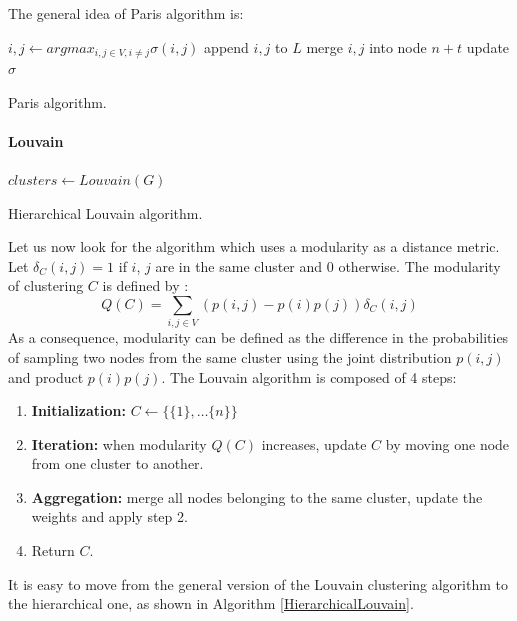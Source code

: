 The general idea of Paris algorithm is:

\begin{algorithm}[h]
    \SetAlgoLined
     {
        $i,j \leftarrow argmax_{i,j \in V, i \ne j}\sigma(i,j)$ \;
        append $i,j$ to $L$
        merge $i,j$ into node $n+t$
        update $\sigma$
    }
    \EndFor
    \caption{Paris algorithm.}
    \label{paris}
\end{algorithm}

\paragraph{Louvain}

\begin{algorithm}[h]
	\SetAlgoLined
	
	$clusters \leftarrow Louvain(G)$\;
	\caption{Hierarchical Louvain algorithm.}
	\label{HierarchicalLouvain}
\end{algorithm}

Let us now look for the algorithm which uses a modularity as a distance metric. Let $\delta_{C}(i, j) = 1$ if $i$, $j$ are in the same cluster and 0 otherwise. The modularity of clustering $C$ is defined by \cite{Newman_2004}: $$Q(C)=\sum_{i,j \in V}(p(i,j)-p(i)p(j))\delta_{C}(i, j)$$ As a consequence, modularity can be defined as the difference in the probabilities of sampling two nodes from the same cluster using the joint distribution $p(i, j)$ and product $p(i)p(j)$. The Louvain algorithm is composed of 4 steps:

\begin{enumerate}
    \item \textbf{Initialization:} $C \leftarrow \{\{1\}, \dots \{n\}\}$
    \item \textbf{Iteration:} when modularity $Q(C)$ increases, update $C$ by moving one node from one cluster to another.
    \item \textbf{Aggregation:} merge all nodes belonging to the same cluster, update the weights and apply step 2.
    \item Return $C$. 
\end{enumerate}

It is easy to move from the general version of the Louvain clustering algorithm to the hierarchical one, as shown in Algorithm \ref{HierarchicalLouvain}.

